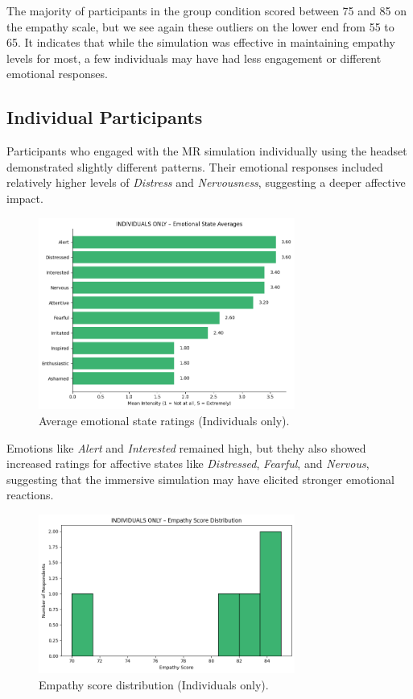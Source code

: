 The majority of participants in the group condition scored between 75 and 85 on the empathy scale, but we see again these outliers on the lower end from 55 to 65. It indicates that while the simulation was effective in maintaining empathy levels for most, a few individuals may have had less engagement or different emotional responses. 

\subsection{Individual Participants}

Participants who engaged with the MR simulation individually using the headset demonstrated slightly different patterns. Their emotional responses included relatively higher levels of \textit{Distress} and \textit{Nervousness}, suggesting a deeper affective impact.

\begin{figure}[H]
    \centering
    \includegraphics[width=0.75\textwidth]{../../Figures/emotional-post-indiv.png}
    \caption{Average emotional state ratings (Individuals only).}
    \label{fig:emotional_post_indiv}
\end{figure}

Emotions like \textit{Alert} and \textit{Interested} remained high, but thehy also showed increased ratings for affective states like \textit{Distressed}, \textit{Fearful}, and \textit{Nervous}, suggesting that the immersive simulation may have elicited stronger emotional reactions.

\begin{figure}[htbp]
    \centering
    \includegraphics[width=0.75\textwidth]{../../Figures/empathy-score-post-indiv.png}
    \caption{Empathy score distribution (Individuals only).}
    \label{fig:empathy_indiv_post}
\end{figure}


